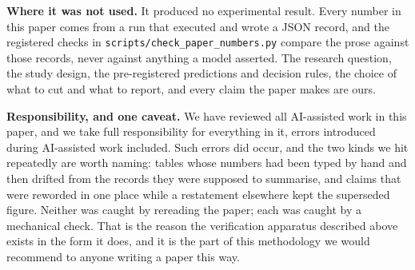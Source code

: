 \textbf{Where it was not used.}  It produced no experimental result.  Every number
in this paper comes from a run that executed and wrote a JSON record, and the
registered checks in \texttt{scripts/check\_paper\_numbers.py} compare the prose
against those records, never against anything a model asserted.  The
research question, the study design, the pre-registered predictions and decision
rules, the choice of what to cut and what to report, and every claim the paper
makes are ours.

\textbf{Responsibility, and one caveat.}  We have reviewed all AI-assisted work
in this paper, and we take full
responsibility for everything in it, errors introduced during
AI-assisted work included.  Such errors did occur, and the two kinds we hit
repeatedly are worth naming:
tables whose numbers had been typed by hand and then drifted from the records
they were supposed to summarise, and claims that were reworded in one place while
a restatement elsewhere kept the superseded figure.  Neither was caught by
rereading the paper; each was caught by a mechanical check.  That is the reason
the verification apparatus described above exists in the form it does, and it is
the part of this methodology we would recommend to anyone writing a paper this
way.

